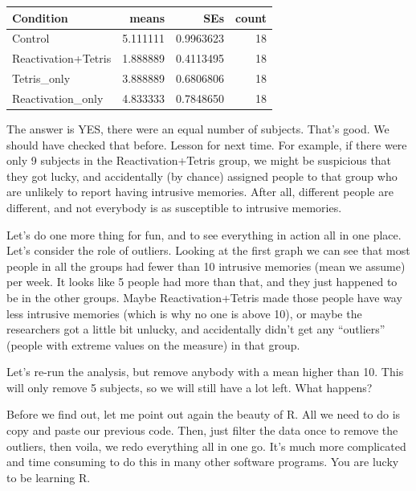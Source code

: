\documentclass[
]{book}
\begin{document}
\begin{tabular}{l|r|r|r}
\hline
Condition & means & SEs & count\\
\hline
Control & 5.111111 & 0.9963623 & 18\\
\hline
Reactivation+Tetris & 1.888889 & 0.4113495 & 18\\
\hline
Tetris\_only & 3.888889 & 0.6806806 & 18\\
\hline
Reactivation\_only & 4.833333 & 0.7848650 & 18\\
\hline
\end{tabular}

The answer is YES, there were an equal number of subjects. That's good. We should have checked that before. Lesson for next time. For example, if there were only 9 subjects in the Reactivation+Tetris group, we might be suspicious that they got lucky, and accidentally (by chance) assigned people to that group who are unlikely to report having intrusive memories. After all, different people are different, and not everybody is as susceptible to intrusive memories.

Let's do one more thing for fun, and to see everything in action all in one place. Let's consider the role of outliers. Looking at the first graph we can see that most people in all the groups had fewer than 10 intrusive memories (mean we assume) per week. It looks like 5 people had more than that, and they just happened to be in the other groups. Maybe Reactivation+Tetris made those people have way less intrusive memories (which is why no one is above 10), or maybe the researchers got a little bit unlucky, and accidentally didn't get any ``outliers'' (people with extreme values on the measure) in that group.

Let's re-run the analysis, but remove anybody with a mean higher than 10. This will only remove 5 subjects, so we will still have a lot left. What happens?

Before we find out, let me point out again the beauty of R. All we need to do is copy and paste our previous code. Then, just filter the data once to remove the outliers, then voila, we redo everything all in one go. It's much more complicated and time consuming to do this in many other software programs. You are lucky to be learning R.
\end{document}
